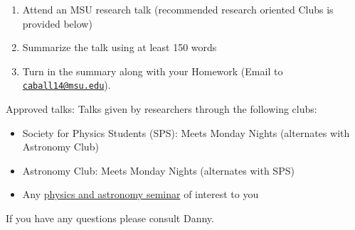 \documentclass[11pt]{article}
\begin{document}
\begin{enumerate}
\def\labelenumi{\arabic{enumi}.}
\item
  Attend an MSU research talk (recommended research oriented Clubs is
  provided below)
\item
  Summarize the talk using at least 150 words
\item
  Turn in the summary along with your Homework (Email to
  \href{mailto:caball14@msu.edu}{\nolinkurl{caball14@msu.edu}}).
\end{enumerate}

Approved talks: Talks given by researchers through the following clubs:

\begin{itemize}
\item
  Society for Physics Students (SPS)\hspace{0pt}: Meets Monday Nights
  (alternates with Astronomy Club)
\item
  Astronomy Club\hspace{0pt}: Meets Monday Nights (alternates with SPS)
\item
  Any \href{https://pa.msu.edu/news-events-seminars/index.aspx}{physics
  and astronomy seminar} of interest to you
\end{itemize}

If you have any questions please consult Danny.

    


    
    
    
\end{document}
